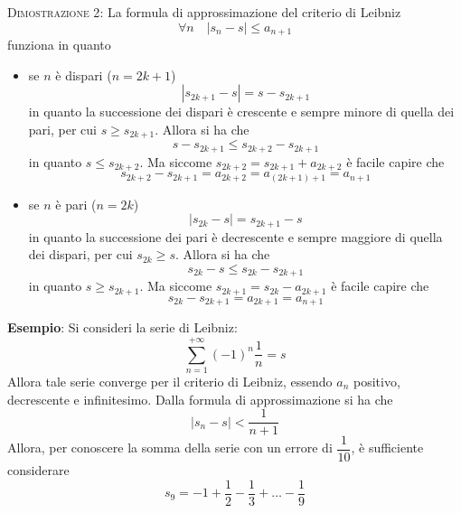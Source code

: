 \documentclass[a4paper]{extarticle}
\begin{document}
\vspace{2em}
\noindent
\normalfont \normalsize
\textsc{Dimostrazione 2}: La formula di approssimazione del criterio di Leibniz
\[\forall n \hspace{1em} \left \vert s_n-s \right \vert \leq a_{n+1}\]
funziona in quanto
\begin{itemize}
    \item se $n$ è dispari ($n=2k+1$)
    \[\left \vert s_{2k+1} - s \right \vert = s-s_{2k+1}\]
    in quanto la successione dei dispari è crescente e sempre minore di quella dei pari, per cui $s \geq s_{2k+1}$. Allora si ha che
    \[s-s_{2k+1}\leq s_{2k+2} - s_{2k+1}\]
    in quanto $s \leq s_{2k+2}$. Ma siccome $s_{2k+2}=s_{2k+1}+a_{2k+2}$ è facile capire che
    \[s_{2k+2} - s_{2k+1} = a_{2k+2} = a_{(2k+1)+1}= a_{n+1}\]
    
    \item se $n$ è pari ($n=2k$)
    \[\left \vert s_{2k} - s \right \vert = s_{2k+1}-s\]
    in quanto la successione dei pari è decrescente e sempre maggiore di quella dei dispari, per cui $s_{2k} \geq s$. Allora si ha che
    \[s_{2k}-s\leq s_{2k} - s_{2k+1}\]
    in quanto $s \geq s_{2k+1}$. Ma siccome $s_{2k+1}=s_{2k}-a_{2k+1}$ è facile capire che
    \[s_{2k} - s_{2k+1} = a_{2k+1} = a_{n+1}\]
\end{itemize}

\vspace{2em}
\noindent
\textbf{Esempio}: Si consideri la serie di Leibniz:
\[\sum_{n=1}^{+\infty} (-1)^n \frac{1}{n} = s\]
Allora tale serie converge per il criterio di Leibniz, essendo $a_n$ positivo, decrescente e infinitesimo. Dalla formula di approssimazione si ha che
\[\left \vert s_n - s \right \vert < \frac{1}{n+1}\]
Allora, per conoscere la somma della serie con un errore di $\dfrac{1}{10}$, è sufficiente considerare
\[s_9 = -1 + \frac{1}{2} - \frac{1}{3} + \dots - \frac{1}{9}\]
\end{document}
